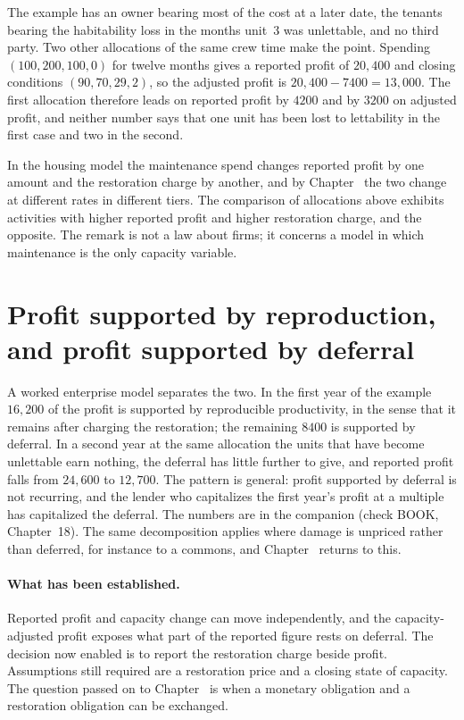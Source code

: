 The example has an owner bearing most of the cost at a later date, the tenants bearing the habitability loss in the months unit~3 was unlettable, and no third party. Two other allocations of the same crew time make the point. Spending $(100,200,100,0)$ for twelve months gives a reported profit of $20{,}400$ and closing conditions $(90,70,29,2)$, so the adjusted profit is $20{,}400-7400=13{,}000$. The first allocation therefore leads on reported profit by $4200$ and by $3200$ on adjusted profit, and neither number says that one unit has been lost to lettability in the first case and two in the second.

\begin{remark}\label{rem:profit-cap}
In the housing model the maintenance spend changes reported profit by one amount and the restoration charge by another, and by Chapter~ the two change at different rates in different tiers. The comparison of allocations above exhibits activities with higher reported profit and higher restoration charge, and the opposite. The remark is not a law about firms; it concerns a model in which maintenance is the only capacity variable.
\end{remark}

\section{Profit supported by reproduction, and profit supported by deferral}

A worked enterprise model separates the two. In the first year of the example $16{,}200$ of the profit is supported by reproducible productivity, in the sense that it remains after charging the restoration; the remaining $8400$ is supported by deferral. In a second year at the same allocation the units that have become unlettable earn nothing, the deferral has little further to give, and reported profit falls from $24{,}600$ to $12{,}700$. The pattern is general: profit supported by deferral is not recurring, and the lender who capitalizes the first year's profit at a multiple has capitalized the deferral. The numbers are in the companion (check BOOK, Chapter~18). The same decomposition applies where damage is unpriced rather than deferred, for instance to a commons, and Chapter~ returns to this.

\paragraph{What has been established.} Reported profit and capacity change can move independently, and the capacity-adjusted profit exposes what part of the reported figure rests on deferral. The decision now enabled is to report the restoration charge beside profit. Assumptions still required are a restoration price and a closing state of capacity. The question passed on to Chapter~ is when a monetary obligation and a restoration obligation can be exchanged.

